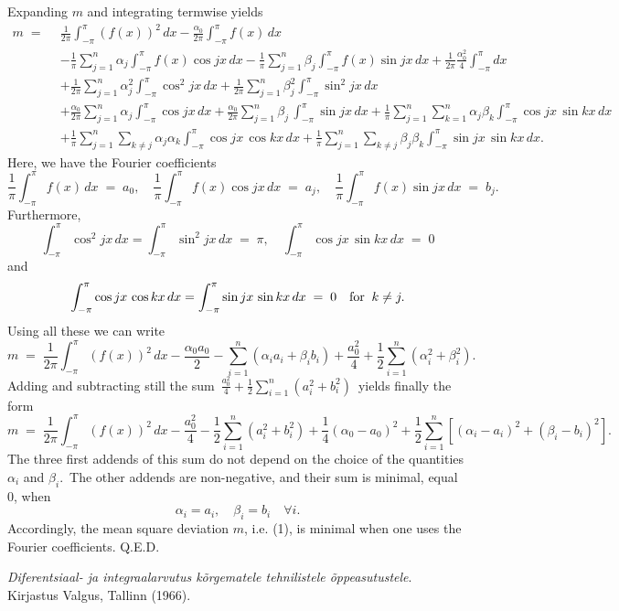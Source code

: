 \documentclass[12pt]{article}
\theoremstyle{definition}
\begin{document}
Expanding $m$ and integrating termwise yields
\begin{align*}
m \;=\;\, & \frac{1}{2\pi}\int_{-\pi}^\pi(f(x))^2\,dx-\frac{\alpha_0}{2\pi}\int_{-\pi}^\pi f(x)\,dx\\
& -\frac{1}{\pi}\sum_{j=1}^n\alpha_j\int_{-\pi}^\pi f(x)\cos{jx}\,dx 
  -\frac{1}{\pi}\sum_{j=1}^n\beta_j \int_{-\pi}^\pi f(x)\sin{jx}\,dx
  +\frac{1}{2\pi}\frac{\alpha_0^2}{4}\int_{-\pi}^\pi dx\\
& +\frac{1}{2\pi}\sum_{j=1}^n\alpha_j^2\int_{-\pi}^\pi\cos^2{jx}\,dx 
  +\frac{1}{2\pi}\sum_{j=1}^n\beta_j^2 \int_{-\pi}^\pi\sin^2{jx}\,dx\\
& +\frac{\alpha_0}{2\pi}\sum_{j=1}^n\alpha_j\int_{-\pi}^\pi\cos{jx}\,dx 
  +\frac{\alpha_0}{2\pi}\sum_{j=1}^n\beta_j\,\int_{-\pi}^\pi\sin{jx}\,dx
+\frac{1}{\pi}\sum_{j=1}^n\sum_{k=1}^n\alpha_j\beta_k\!\int_{-\pi}^\pi\cos{jx}\,\sin{kx}\,dx\\
& +\frac{1}{\pi}\sum_{j=1}^n\sum_{k\neq j}\alpha_j\alpha_k\int_{-\pi}^\pi\cos{jx}\,\cos{kx}\,dx 
  +\frac{1}{\pi}\sum_{j=1}^n\sum_{k\neq j}\beta_j\beta_k\int_{-\pi}^\pi\sin{jx}\,\sin{kx}\,dx.
\end{align*}
Here, we have the Fourier coefficients
$$\frac{1}{\pi}\int_{-\pi}^\pi f(x)\,dx \;=\; a_0, \quad 
\frac{1}{\pi}\int_{-\pi}^\pi f(x)\cos{jx}\,dx \;=\; a_j, \quad \frac{1}{\pi}\int_{-\pi}^\pi f(x)\sin{jx}\,dx \;=\; b_j.$$
Furthermore,
$$\int_{-\pi}^\pi\cos^2{jx}\,dx = \int_{-\pi}^\pi\sin^2{jx}\,dx \;=\; \pi, \quad 
\int_{-\pi}^\pi\cos{jx}\,\sin{kx}\,dx \;=\; 0$$
and
$$\int_{-\pi}^\pi\cos{jx}\,\cos{kx}\,dx = \int_{-\pi}^\pi\sin{jx}\,\sin{kx}\,dx \;=\; 0 \quad \mbox{for\;\;} k \neq j.$$
Using all these we can write
$$m \;=\; \frac{1}{2\pi}\int_{-\pi}^\pi(f(x))^2\,dx-\frac{\alpha_0a_0}{2}-\sum_{i=1}^n(\alpha_ia_i+\beta_ib_i)+
\frac{a_0^2}{4}+\frac{1}{2}\sum_{i=1}^n(\alpha_i^2+\beta_i^2).$$
Adding and subtracting still the sum \,$\frac{a_0^2}{4}+\frac{1}{2}\sum_{i=1}^n(a_i^2+b_i^2)$\, yields finally the form
$$m \;=\; \frac{1}{2\pi}\int_{-\pi}^\pi(f(x))^2\,dx-\frac{a_0^2}{4}
-\frac{1}{2}\sum_{i=1}^n(a_i^2+b_i^2)+\frac{1}{4}(\alpha_0-a_0)^2
+\frac{1}{2}\sum_{i=1}^n[(\alpha_i-a_i)^2+(\beta_i-b_i)^2].$$
The three first addends of this sum do not depend on the choice of the quantities $\alpha_i$ and $\beta_i$.\, The other addends are non-negative, and their sum is minimal, equal 0, when 
$$\alpha_i = a_i, \quad \beta_i = b_i \quad \forall i.$$
Accordingly, the mean square deviation $m$, i.e. (1), is minimal when one uses the Fourier coefficients. Q.E.D.

\begin{thebibliography}{9}
 {\em Diferentsiaal- ja integraalarvutus k\~{o}rgematele tehnilistele \~{o}ppeasutustele}.\, Kirjastus Valgus, Tallinn  (1966).
\end{thebibliography}

\end{document}
